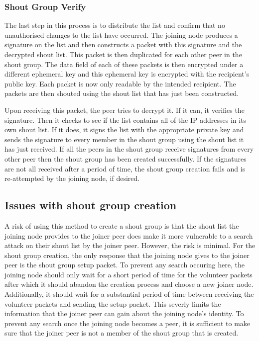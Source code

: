 \documentclass[ %
                    author={Luke Murray},
                supervisor={Dr. Simon Hollis},
                     title={Shadow Peer-to-Peer Networks},
                  subtitle={},
                    degree={MEng},
                      year={2013} ]{thesis}
\begin{document}
\subsubsection{Shout Group Verify}

The last step in this process is to distribute the list and confirm that no unauthorised changes to the list have occurred. The joining node produces a signature on the list and then constructs a packet with this signature and the decrypted shout list. This packet is then duplicated for each other peer in the shout group. The data field of each of these packets is then encrypted under a different ephemeral key and this ephemeral key is encrypted with the recipient's public key. Each packet is now only readable by the intended recipient. The packets are then shouted using the shout list that has just been constructed.

Upon receiving this packet, the peer tries to decrypt it. If it can, it verifies the signature. Then it checks to see if the list contains all of the IP addresses in its own shout list. If it does, it signs the list with the appropriate private key and sends the signature to every member in the shout group using the shout list it has just received. If all the peers in the shout group receive signatures from every other peer then the shout group has been created successfully. If the signatures are not all received after a period of time, the shout group creation fails and is re-attempted by the joining node, if desired.

\subsection{Issues with shout group creation}

A risk of using this method to create a shout group is that the shout list the joining node provides to the joiner peer does make it more vulnerable to a search attack on their shout list by the joiner peer. However, the risk is minimal. For the shout group creation, the only response that the joining node gives to the joiner peer is the shout group setup packet. To prevent any search occuring here, the joining node should only wait for a short period of time for the volunteer packets after which it should abandon the creation process and choose a new joiner node. Additionally, it should wait for a substantial period of time between receiving the volunteer packets and sending the setup packet. This severly limits the information that the joiner peer can gain about the joining node's identity. To prevent any search once the joining node becomes a peer, it is sufficient to make sure that the joiner peer is not a member of the shout group that is created.
\end{document}
